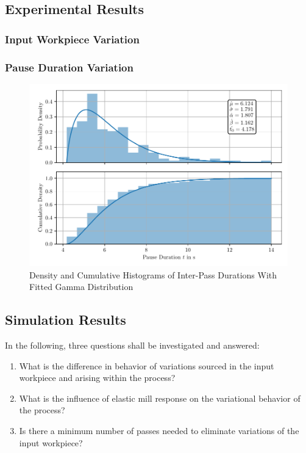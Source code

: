 \subsection{Experimental Results}\label{subsec:experimental-results}

\subsubsection{Input Workpiece Variation}\label{subsubsec:input-workpiece-variation}

\subsubsection{Pause Duration Variation}\label{subsubsec:pause-duration-variation}

\begin{figure}
    \centering
    \includegraphics[width=\linewidth]{img/plot_histogram_pauses}
    \caption{Density and Cumulative Histograms of Inter-Pass Durations With Fitted Gamma Distribution}
    \label{fig:plot_histogram_pauses}
\end{figure}

\subsection{Simulation Results}\label{subsec:simulation-results}

In the following, three questions shall be investigated and answered:
\begin{enumerate}
    \item What is the difference in behavior of variations sourced in the input workpiece and arising within the process?
    \item What is the influence of elastic mill response on the variational behavior of the process?
    \item Is there a minimum number of passes needed to eliminate variations of the input workpiece?
\end{enumerate}

